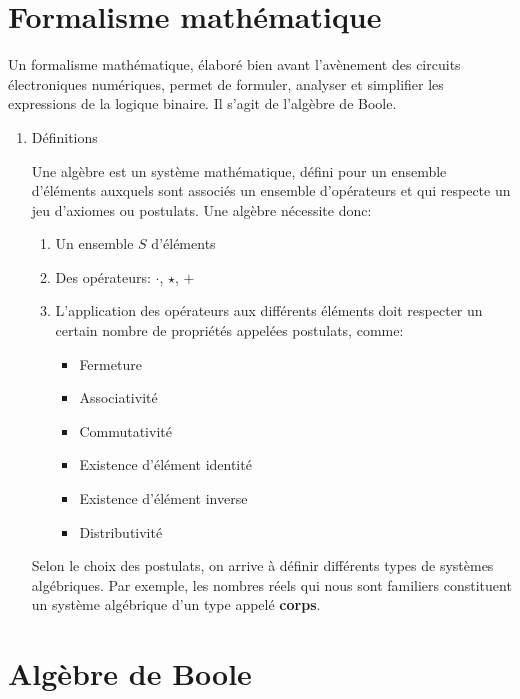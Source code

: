 \documentclass[letter, oneside]{book}
\begin{document}
\section{Formalisme mathématique}
\label{sec:org9a15238}

Un formalisme mathématique, élaboré bien avant l'avènement des
circuits électroniques numériques, permet de formuler, analyser et
simplifier les expressions de la logique binaire. Il s'agit de
l'algèbre de Boole. 

\begin{enumerate}
\item Définitions
\label{sec:org139ccc3}

Une algèbre est un système mathématique, défini pour un ensemble
d'éléments auxquels sont associés un ensemble d'opérateurs et qui
respecte un jeu d'axiomes ou postulats. Une algèbre nécessite donc:

\begin{enumerate}
\item Un ensemble \(S\) d'éléments

\item Des opérateurs: \(\cdot\), \(\star\), \(+\)

\item L'application des opérateurs aux différents éléments doit respecter
un certain nombre de propriétés appelées postulats, comme:

\begin{itemize}
\item Fermeture

\item Associativité

\item Commutativité

\item Existence d'élément identité

\item Existence d'élément inverse

\item Distributivité
\end{itemize}
\end{enumerate}

Selon le choix des postulats, on arrive à définir différents types de
systèmes algébriques. Par exemple, les nombres réels qui nous sont
familiers constituent un système algébrique d'un type appelé \textbf{corps}.
\end{enumerate}

\section{Algèbre de Boole}
\label{sec:org0460a6e}
\end{document}
